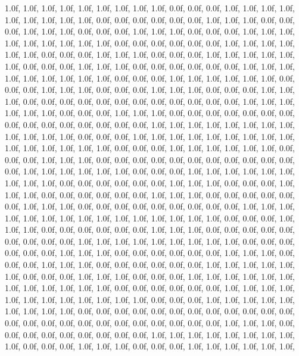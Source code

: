 {   1.0f, 1.0f, 1.0f,   1.0f, 1.0f, 1.0f,   1.0f, 1.0f, 1.0f,   0.0f, 0.0f, 0.0f,   1.0f, 1.0f, 1.0f,   1.0f, 1.0f, 1.0f,   1.0f, 1.0f, 1.0f,   0.0f, 0.0f, 0.0f,   0.0f, 0.0f, 0.0f,   1.0f, 1.0f, 1.0f,   0.0f, 0.0f, 0.0f,   1.0f, 1.0f, 1.0f,   0.0f, 0.0f, 0.0f,   1.0f, 1.0f, 1.0f,   0.0f, 0.0f, 0.0f,   1.0f, 1.0f, 1.0f,   1.0f, 1.0f, 1.0f,   1.0f, 1.0f, 1.0f,   0.0f, 0.0f, 0.0f,   0.0f, 0.0f, 0.0f,   1.0f, 1.0f, 1.0f,   1.0f, 1.0f, 1.0f,   0.0f, 0.0f, 0.0f,   1.0f, 1.0f, 1.0f,   0.0f, 0.0f, 0.0f,   1.0f, 1.0f, 1.0f,   1.0f, 1.0f, 1.0f,   0.0f, 0.0f, 0.0f,   1.0f, 1.0f, 1.0f,   0.0f, 0.0f, 0.0f,   0.0f, 0.0f, 0.0f,   1.0f, 1.0f, 1.0f,   
   1.0f, 1.0f, 1.0f,   1.0f, 1.0f, 1.0f,   0.0f, 0.0f, 0.0f,   1.0f, 1.0f, 1.0f,   1.0f, 1.0f, 1.0f,   0.0f, 0.0f, 0.0f,   1.0f, 1.0f, 1.0f,   0.0f, 0.0f, 0.0f,   1.0f, 1.0f, 1.0f,   0.0f, 0.0f, 0.0f,   1.0f, 1.0f, 1.0f,   0.0f, 0.0f, 0.0f,   0.0f, 0.0f, 0.0f,   0.0f, 0.0f, 0.0f,   0.0f, 0.0f, 0.0f,   1.0f, 1.0f, 1.0f,   1.0f, 1.0f, 1.0f,   0.0f, 0.0f, 0.0f,   1.0f, 1.0f, 1.0f,   0.0f, 0.0f, 0.0f,   0.0f, 0.0f, 0.0f,   0.0f, 0.0f, 0.0f,   0.0f, 0.0f, 0.0f,   0.0f, 0.0f, 0.0f,   1.0f, 1.0f, 1.0f,   1.0f, 1.0f, 1.0f,   1.0f, 1.0f, 1.0f,   1.0f, 1.0f, 1.0f,   0.0f, 0.0f, 0.0f,   1.0f, 1.0f, 1.0f,   1.0f, 1.0f, 1.0f,   1.0f, 1.0f, 1.0f,   
   1.0f, 1.0f, 1.0f,   1.0f, 1.0f, 1.0f,   0.0f, 0.0f, 0.0f,   1.0f, 1.0f, 1.0f,   1.0f, 1.0f, 1.0f,   0.0f, 0.0f, 0.0f,   1.0f, 1.0f, 1.0f,   0.0f, 0.0f, 0.0f,   0.0f, 0.0f, 0.0f,   0.0f, 0.0f, 0.0f,   0.0f, 0.0f, 0.0f,   1.0f, 1.0f, 1.0f,   1.0f, 1.0f, 1.0f,   0.0f, 0.0f, 0.0f,   1.0f, 1.0f, 1.0f,   1.0f, 1.0f, 1.0f,   1.0f, 1.0f, 1.0f,   0.0f, 0.0f, 0.0f,   0.0f, 0.0f, 0.0f,   1.0f, 1.0f, 1.0f,   0.0f, 0.0f, 0.0f,   1.0f, 1.0f, 1.0f,   0.0f, 0.0f, 0.0f,   0.0f, 0.0f, 0.0f,   1.0f, 1.0f, 1.0f,   0.0f, 0.0f, 0.0f,   0.0f, 0.0f, 0.0f,   1.0f, 1.0f, 1.0f,   0.0f, 0.0f, 0.0f,   0.0f, 0.0f, 0.0f,   0.0f, 0.0f, 0.0f,   1.0f, 1.0f, 1.0f,   
   1.0f, 1.0f, 1.0f,   1.0f, 1.0f, 1.0f,   1.0f, 1.0f, 1.0f,   1.0f, 1.0f, 1.0f,   0.0f, 0.0f, 0.0f,   1.0f, 1.0f, 1.0f,   0.0f, 0.0f, 0.0f,   0.0f, 0.0f, 0.0f,   1.0f, 1.0f, 1.0f,   0.0f, 0.0f, 0.0f,   0.0f, 0.0f, 0.0f,   0.0f, 0.0f, 0.0f,   1.0f, 1.0f, 1.0f,   1.0f, 1.0f, 1.0f,   1.0f, 1.0f, 1.0f,   0.0f, 0.0f, 0.0f,   0.0f, 0.0f, 0.0f,   1.0f, 1.0f, 1.0f,   0.0f, 0.0f, 0.0f,   0.0f, 0.0f, 0.0f,   1.0f, 1.0f, 1.0f,   0.0f, 0.0f, 0.0f,   1.0f, 1.0f, 1.0f,   0.0f, 0.0f, 0.0f,   0.0f, 0.0f, 0.0f,   1.0f, 1.0f, 1.0f,   1.0f, 1.0f, 1.0f,   0.0f, 0.0f, 0.0f,   1.0f, 1.0f, 1.0f,   0.0f, 0.0f, 0.0f,   1.0f, 1.0f, 1.0f,   1.0f, 1.0f, 1.0f,   
   1.0f, 1.0f, 1.0f,   1.0f, 1.0f, 1.0f,   0.0f, 0.0f, 0.0f,   0.0f, 0.0f, 0.0f,   1.0f, 1.0f, 1.0f,   1.0f, 1.0f, 1.0f,   1.0f, 1.0f, 1.0f,   1.0f, 1.0f, 1.0f,   0.0f, 0.0f, 0.0f,   1.0f, 1.0f, 1.0f,   1.0f, 1.0f, 1.0f,   1.0f, 1.0f, 1.0f,   0.0f, 0.0f, 0.0f,   0.0f, 0.0f, 0.0f,   0.0f, 0.0f, 0.0f,   0.0f, 0.0f, 0.0f,   0.0f, 0.0f, 0.0f,   0.0f, 0.0f, 0.0f,   0.0f, 0.0f, 0.0f,   0.0f, 0.0f, 0.0f,   1.0f, 1.0f, 1.0f,   0.0f, 0.0f, 0.0f,   0.0f, 0.0f, 0.0f,   0.0f, 0.0f, 0.0f,   1.0f, 1.0f, 1.0f,   1.0f, 1.0f, 1.0f,   1.0f, 1.0f, 1.0f,   0.0f, 0.0f, 0.0f,   1.0f, 1.0f, 1.0f,   0.0f, 0.0f, 0.0f,   1.0f, 1.0f, 1.0f,   1.0f, 1.0f, 1.0f,   
}

